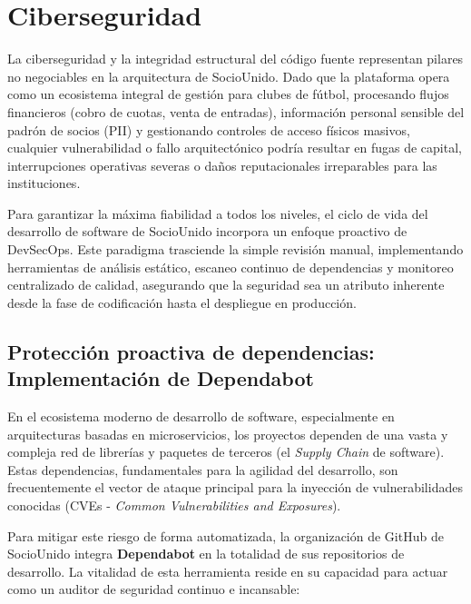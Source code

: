 \section{Ciberseguridad}

La ciberseguridad y la integridad estructural del código fuente representan pilares no negociables en la arquitectura de SocioUnido. Dado que la plataforma opera como un ecosistema integral de gestión para clubes de fútbol, procesando flujos financieros (cobro de cuotas, venta de entradas), información personal sensible del padrón de socios (PII) y gestionando controles de acceso físicos masivos, cualquier vulnerabilidad o fallo arquitectónico podría resultar en fugas de capital, interrupciones operativas severas o daños reputacionales irreparables para las instituciones.

Para garantizar la máxima fiabilidad a todos los niveles, el ciclo de vida del desarrollo de software de SocioUnido incorpora un enfoque proactivo de DevSecOps. Este paradigma trasciende la simple revisión manual, implementando herramientas de análisis estático, escaneo continuo de dependencias y monitoreo centralizado de calidad, asegurando que la seguridad sea un atributo inherente desde la fase de codificación hasta el despliegue en producción.

\subsection{Protección proactiva de dependencias: Implementación de Dependabot}

En el ecosistema moderno de desarrollo de software, especialmente en arquitecturas basadas en microservicios, los proyectos dependen de una vasta y compleja red de librerías y paquetes de terceros (el \textit{Supply Chain} de software). Estas dependencias, fundamentales para la agilidad del desarrollo, son frecuentemente el vector de ataque principal para la inyección de vulnerabilidades conocidas (CVEs - \textit{Common Vulnerabilities and Exposures}).

Para mitigar este riesgo de forma automatizada, la organización de GitHub de SocioUnido integra \textbf{Dependabot} en la totalidad de sus repositorios de desarrollo. La vitalidad de esta herramienta reside en su capacidad para actuar como un auditor de seguridad continuo e incansable:

